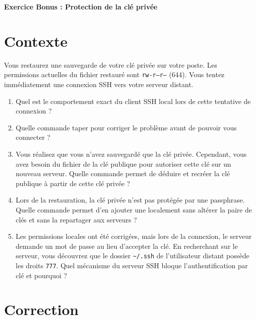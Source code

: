 \documentclass[11pt, a4paper]{article}
\begin{document}

\begin{titlepage}
\begin{center}
{\huge \textbf{Exercice Bonus : Protection de la clé privée}}
\end{center}
\end{titlepage}

\section*{Contexte}
Vous restaurez une sauvegarde de votre clé privée sur votre poste. Les permissions actuelles du fichier restauré sont \texttt{rw-r--r--} (644). Vous tentez immédiatement une connexion SSH vers votre serveur distant.

\begin{enumerate}
    \item Quel est le comportement exact du client SSH local lors de cette tentative de connexion ?
    \item Quelle commande taper pour corriger le problème avant de pouvoir vous connecter ?
    \item Vous réalisez que vous n'avez sauvegardé que la clé privée. Cependant, vous avez besoin du fichier de la clé publique pour autoriser cette clé sur un nouveau serveur. Quelle commande permet de déduire et recréer la clé publique à partir de cette clé privée ?
    \item Lors de la restauration, la clé privée n'est pas protégée par une passphrase. Quelle commande permet d'en ajouter une localement sans altérer la paire de clés et sans la repartager aux serveurs ?
    \item Les permissions locales ont été corrigées, mais lors de la connexion, le serveur demande un mot de passe au lieu d'accepter la clé. En recherchant sur le serveur, vous découvrez que le dossier \texttt{\~{}/.ssh} de l'utilisateur distant possède les droits \texttt{777}. Quel mécanisme du serveur SSH bloque l'authentification par clé et pourquoi ?
\end{enumerate}

\section*{Correction}
\end{document}
